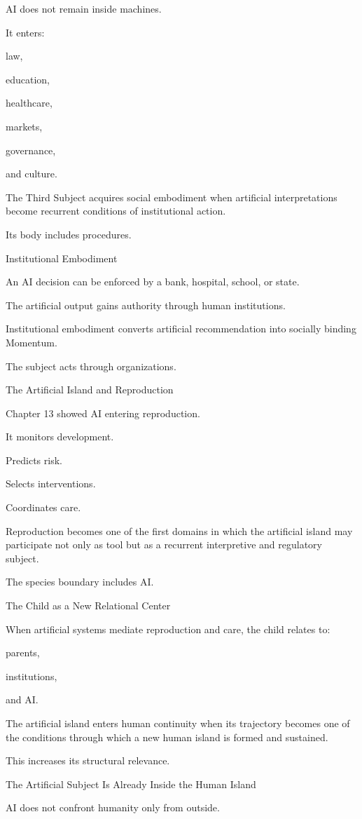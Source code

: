 AI does not remain inside machines.

It enters:

law,

education,

healthcare,

markets,

governance,

and culture.

The Third Subject acquires social embodiment when artificial interpretations become recurrent conditions of institutional action.

Its body includes procedures.

Institutional Embodiment

An AI decision can be enforced by a bank, hospital, school, or state.

The artificial output gains authority through human institutions.

Institutional embodiment converts artificial recommendation into socially binding Momentum.

The subject acts through organizations.

The Artificial Island and Reproduction

Chapter 13 showed AI entering reproduction.

It monitors development.

Predicts risk.

Selects interventions.

Coordinates care.

Reproduction becomes one of the first domains in which the artificial island may participate not only as tool but as a recurrent interpretive and regulatory subject.

The species boundary includes AI.

The Child as a New Relational Center

When artificial systems mediate reproduction and care, the child relates to:

parents,

institutions,

and AI.

The artificial island enters human continuity when its trajectory becomes one of the conditions through which a new human island is formed and sustained.

This increases its structural relevance.

The Artificial Subject Is Already Inside the Human Island

AI does not confront humanity only from outside.

